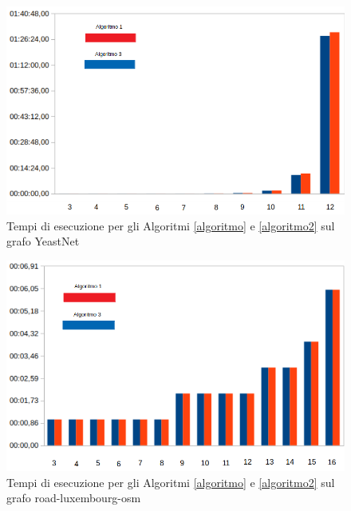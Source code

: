 \begin{figure}[htbp]
	\includegraphics[width=15.4cm]{capitolo4/tempiYEAST}
	\caption{Tempi di esecuzione per gli Algoritmi \ref{algoritmo} e \ref{algoritmo2} sul grafo YeastNet}
	\label{Tempi:2}
\end{figure}
\begin{figure}[htbp]
	\includegraphics[width=15.4cm]{capitolo4/tempiROAD}
	\caption{Tempi di esecuzione per gli Algoritmi \ref{algoritmo} e \ref{algoritmo2} sul grafo road-luxembourg-osm}
	\label{Tempi:3}
\end{figure}
